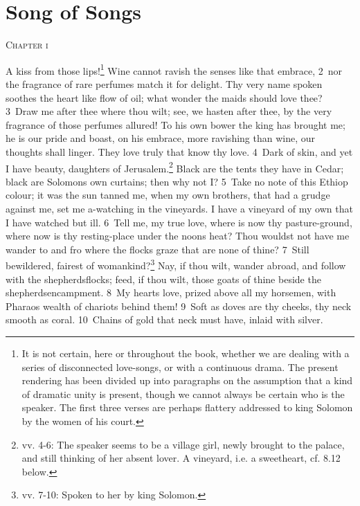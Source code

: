 \documentclass[10pt]{book} %
\begin{document}
\chapter*{Song of Songs}

\begin{large}\begin{center}\textsc{Chapter i}\end{center}\end{large}
\lettrine[lines=3]{A}{} kiss from those lips!\footnote[1]{It is not certain, here or throughout the book, whether we are dealing with a series of disconnected love-songs, or with a continuous drama. The present rendering has been divided up into paragraphs on the assumption that a kind of dramatic unity is present, though we cannot always be certain who is the speaker. The first three verses are perhaps flattery addressed to king Solomon by the women of his court.} Wine cannot ravish the senses like that embrace, \textcolor{benred8}{2}~nor the fragrance of rare perfumes match it for delight. Thy very name spoken soothes the heart like flow of oil; what wonder the maids should love thee? \textcolor{benred8}{3}~Draw me after thee where thou wilt; see, we hasten after thee, by the very fragrance of those perfumes allured! To his own bower the king has brought me; he is our pride and boast, on his embrace, more ravishing than wine, our thoughts shall linger. They love truly that know thy love.
\textcolor{benred8}{4}~Dark of skin, and yet I have beauty, daughters of Jerusalem.\footnote[2]{vv. 4-6: The speaker seems to be a village girl, newly brought to the palace, and still thinking of her absent lover. \textasciigrave A vineyard\textquotesingle , i.e. a sweetheart, cf. 8.12 below.} Black are the tents they have in Cedar; black are Solomon\textquotesingle s own curtains; then why not I? \textcolor{benred8}{5}~Take no note of this Ethiop colour; it was the sun tanned me, when my own brothers, that had a grudge against me, set me a-watching in the vineyards. I have a vineyard of my own that I have watched but ill. \textcolor{benred8}{6}~Tell me, my true love, where is now thy pasture-ground, where now is thy resting-place under the noon\textquotesingle s heat? Thou wouldst not have me wander to and fro where the flocks graze that are none of thine?
\textcolor{benred8}{7}~Still bewildered, fairest of womankind?\footnote[3]{vv. 7-10: Spoken to her by king Solomon.} Nay, if thou wilt, wander abroad, and follow with the shepherds\textquotesingle  flocks; feed, if thou wilt, those goats of thine beside the shepherds\textquotesingle  encampment. \textcolor{benred8}{8}~My heart\textquotesingle s love, prized above all my horsemen, with Pharao\textquotesingle s wealth of chariots behind them! \textcolor{benred8}{9}~Soft as doves are thy cheeks, thy neck smooth as coral. \textcolor{benred8}{10}~Chains of gold that neck must have, inlaid with silver.
\end{document}
